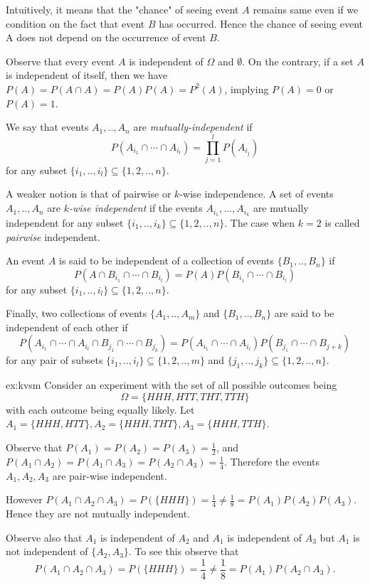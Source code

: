 \begin{remark}
Intuitively, it means that the "chance" of seeing event $A$ remains same even if we condition on the fact that event $B$ has occurred. Hence the chance of seeing event A does not depend on the occurrence of event $B$.
\end{remark}

Observe that every event $A$ is independent of $\Omega$ and $\emptyset$. On the contrary, if a set $A$ is independent of itself, then we have $P(A) = P(A\cap A) = P(A) P(A) = P^2(A)$, implying $P(A)=0$ or $P(A)=1$.


We say that events $A_1,..,A_n$ are \textit{mutually-independent} if
$$P(A_{i_1}\cap \cdots \cap A_{i_l}) = \prod_{j=1}^l P(A_{i_j})$$
for any subset $\{i_1,..,i_l\} \subseteq \{1,2,..,n\}$.

A weaker notion is that of pairwise or $k$-wise independence. A set of events $A_1,..,A_n$ are \textit{$k$-wise independent} if the events $A_{i_1},...,A_{i_k}$ are mutually independent for any subset $\{i_1,..,i_k\} \subseteq \{1,2,..,n\}$. The case when $k=2$ is called \textit{pairwise} independent.

An event $A$ is said to be independent of a collection of events $\{B_1,..,B_n\}$ if
$$ P(A \cap B_{i_1}\cap \cdots \cap B_{i_l}) = P(A) P(B_{i_1}\cap \cdots \cap B_{i_l})   $$
for any subset $\{i_1,..,i_l\} \subseteq \{1,2,..,n\}$.

Finally, two collections of events $\{A_1,..,A_m\}$ and $\{B_1,..,B_n\}$ are said to be independent of each other if
  $$ P(A_{i_1}\cap \cdots \cap A_{i_l} \cap B_{j_1}\cap \cdots \cap B_{j_k}) = P(A_{i_1}\cap \cdots \cap A_{i_l}) P(B_{j_1}\cap \cdots \cap B_{j+k})   $$
for any pair of subsets $\{i_1,..,i_l\} \subseteq \{1,2,..,m\}$ and   $\{j_1,..,j_k\} \subseteq \{1,2,..,n\}$.

\begin{exmp}{ex:kvsm}
Consider an experiment with the set of all possible outcomes being
$$\Omega=\{HHH,HTT,THT,TTH\}$$
with each outcome being equally likely. Let $A_1=\{HHH,HTT\}, A_2=\{HHH,THT\}, A_3=\{HHH,TTH\}$.

Observe that $P(A_1)=P(A_2)=P(A_3)=\frac 12$, and $P(A_1 \cap A_2)=P(A_1 \cap A_3) = P(A_2 \cap A_3)=\frac 14$. Therefore the events $A_1, A_2, A_3$ are pair-wise independent.

However $P(A_1 \cap A_2 \cap A_3)=P(\{HHH\})=\frac 14 \neq \frac 18 = P(A_1) P(A_2) P(A_3)$. Hence they are not mutually independent.

Observe also that $A_1$ is independent of $A_2$ and $A_1$ is independent of $A_3$ but $A_1$ is not independent of $\{A_2,A_3\}$. To see this observe that
$$ P(A_1 \cap A_2 \cap A_3)=P(\{HHH\})=\frac 14 \neq \frac 18 = P(A_1) P(A_2\cap A_3).  $$
\end{exmp}

